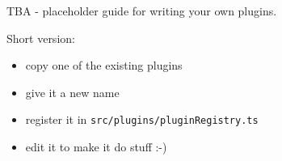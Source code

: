 TBA - placeholder guide for writing your own plugins.

Short version:

\begin{itemize}
\tightlist
\item
  copy one of the existing plugins
\item
  give it a new name
\item
  register it in \texttt{src/plugins/pluginRegistry.ts}
\item
  edit it to make it do stuff :-)
\end{itemize}
